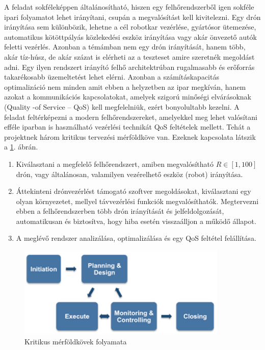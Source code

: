 A feladat sokféleképpen általánosítható, hiszen egy felhőrendszerből igen sokféle ipari folyamatot lehet irányítani, csupán a megvalósítást kell kivitelezni. Egy drón irányítása sem különbözik, lehetne a cél robotkar vezérlése, gyártósor ütemezése, automatikus kötöttpályás közlekedési eszköz irányítása vagy akár önvezető autók feletti vezérlés. Azonban a témámban nem egy drón irányítását, hanem több, akár tíz-húsz, de akár százat is elérheti az a teszteset amire szeretnék megoldást adni. Egy ilyen rendszert irányító felhő architektrúban rugalmasabb és erőforrás takarékosabb üzemeltetést lehet elérni. Azonban a számításkapacitás optimalizáció nem minden amit ebben a helyzetben az ipar megkíván, hanem azokat a kommunikációs kapcsolatokat, amelyek szigorú minőségi elvárásoknak (Quality -of Service – QoS) kell megfelelniük, ezért bonyolultabb kezelni. A feladat feltérképezni a modern felhőrendszereket, amelyekkel meg lehet valósítani efféle iparban is használható vezérlési technikát QoS feltételek mellett. Tehát a projektnek három kritikus tervezési mérföldköve van. Ezeknek kapcsolata látszik a \ref{fig:merfold}. ábrán.
\begin{enumerate}
	\item Kiválasztani a megfelelő felhőrendszert, amiben megvalósítható $R\in [1, 100]$ drón, vagy általánosan, valamilyen vezérelhető eszköz (robot) irányítása.
	\item Áttekinteni drónvezérlést támogató szoftver megoldásokat, kiválasztani egy olyan környezetet, mellyel távvezérlési funkciók megvalósíthatók. Megtervezni ebben a felhőrendszerben több drón irányítását és jelfeldolgozását, automatikusan és biztosítva, hogy hiba esetén visszaálljon a működő állapot.
	\item A meglévő rendszer analizálása, optimalizálása és egy QoS feltétel felállítása.
\end{enumerate}
\begin{figure}
	\centering
	\includegraphics[width=10cm]{figures/plan_excecute_monitor.png}
	\caption{Kritikus mérföldkövek folyamata \cite{ProjecPlan}}
	\label{fig:merfold}
\end{figure}

